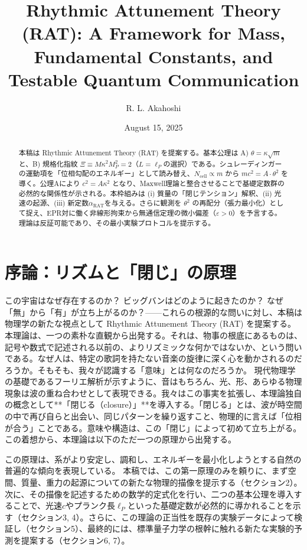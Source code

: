 \documentclass[11pt,a4paper,ja=standard]{ltjarticle}
\title{Rhythmic Attunement Theory (RAT): A Framework for Mass, Fundamental Constants, and Testable Quantum Communication}
\author{R. L. Akahoshi}
\affil{Independent Researcher, Tokyo, Japan \\ \href{mailto:r.l.akahoshi@gmail.com}{\texttt{r.l.akahoshi@gmail.com}}}
\date{August 15, 2025}
\newcommand{\rat}{\mathrm{RAT}}
\newcommand{\lp}{\ell_P}
\newcommand{\ar}{\alpha_{\rat}}
\newcommand{\kappaR}{\kappa}
\begin{document}
\maketitle

\begin{abstract}
\noindent
本稿は Rhythmic Attunement Theory (RAT) を提案する。基本公理は A) $\theta=\kappaR\sqrt{m}$ と、B) 規格化指紋 $\Xi \equiv M\kappaR^2 M_P^2 = 2$（$L=\lp$の選択）である。シュレーディンガーの運動項を「位相勾配のエネルギー」として読み替え、$N_{\text{cell}}\propto m$ から $mc^2=A\cdot\theta^2$ を導く。公理Aにより $c^2=A\kappaR^2$ となり、Maxwell理論と整合させることで基礎定数群の必然的な関係性が示される。本枠組みは (i) 質量の「閉じテンション」解釈、(ii) 光速の起源、(iii) 新定数$\ar$を与える。さらに観測を $\theta^2$ の再配分（張力最小化）として捉え、EPR対に働く非線形拘束から無通信定理の微小偏差（$\varepsilon>0$）を予言する。理論は反証可能であり、その最小実験プロトコルを提示する。
\end{abstract}

\section{序論：リズムと「閉じ」の原理}
この宇宙はなぜ存在するのか？ ビッグバンはどのように起きたのか？ なぜ「無」から「有」が立ち上がるのか？——これらの根源的な問いに対し、本稿は物理学の新たな視点として Rhythmic Attunement Theory (RAT) を提案する。
本理論は、一つの素朴な直観から出発する。それは、物事の根底にあるものは、記号や数式で記述される以前の、よりリズミックな何かではないか、という問いである。なぜ人は、特定の歌詞を持たない音楽の旋律に深く心を動かされるのだろうか。そもそも、我々が認識する「意味」とは何なのだろうか。
現代物理学の基礎であるフーリエ解析が示すように、音はもちろん、光、形、あらゆる物理現象は波の重ね合わせとして表現できる。我々はこの事実を拡張し、本理論独自の概念として**「閉じる（closure）」**を導入する。「閉じる」とは、波が時空間の中で再び自らと出会い、同じパターンを繰り返すこと、物理的に言えば「位相が合う」ことである。意味や構造は、この「閉じ」によって初めて立ち上がる。
この着想から、本理論は以下のただ一つの原理から出発する。
\begin{center}
\end{center}
この原理は、系がより安定し、調和し、エネルギーを最小化しようとする自然の普遍的な傾向を表現している。
本稿では、この第一原理のみを頼りに、まず空間、質量、重力の起源についての新たな物理的描像を提示する（セクション2）。次に、その描像を記述するための数学的定式化を行い、二つの基本公理を導入することで、光速$c$やプランク長$\lp$といった基礎定数が必然的に導かれることを示す（セクション3, 4）。さらに、この理論の正当性を既存の実験データによって検証し（セクション5）、最終的には、標準量子力学の根幹に触れる新たな実験的予測を提案する（セクション6, 7）。
\end{document}
